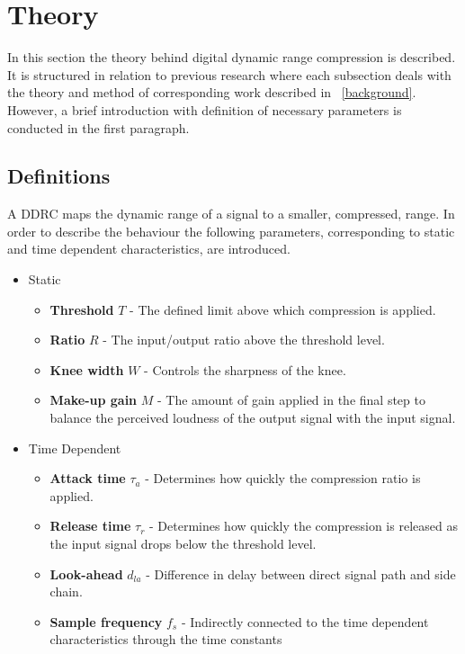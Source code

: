 \documentclass[../main2.tex]{subfiles}
\begin{document}
\section{Theory}\label{sec_theory}
In this section the theory behind digital dynamic range compression is described. It is structured in relation to previous research where each subsection deals with the theory and method of corresponding work described in ~\ref{background}. However, a brief introduction with definition of necessary parameters is conducted in the first paragraph. 

\subsection{Definitions} \label{theory_definitions}
A DDRC maps the dynamic range of a signal to a smaller, compressed, range. In order to describe the behaviour the following parameters, corresponding to static and time dependent characteristics, are introduced.
\begin{itemize}
\item{Static}
	\begin{itemize}
	\item \textbf{Threshold} $T$ - The defined limit above which compression is applied.
	\item \textbf{Ratio} $R$ - The input/output ratio above the threshold level.
	\item \textbf{Knee width}  $W$ - Controls the sharpness of the knee.
	\item \textbf{Make-up gain}  $M$ - The amount of gain applied in the final step to balance the perceived loudness of the output signal with the input signal.
\end{itemize}
\item{Time Dependent}
	\begin{itemize}
	\item \textbf{Attack time} $\tau_{a}$ - Determines how quickly the compression ratio is applied.
	\item \textbf{Release time} $\tau_{r}$ - Determines how quickly the compression is released as the input signal drops below the threshold level.
	\item \textbf{Look-ahead} $d_{la}$ - Difference in delay between direct signal path and side chain. 
	\item \textbf{Sample frequency} $f_{s}$ - Indirectly connected to the time dependent characteristics through the time constants
	\end{itemize}
\end{itemize}
\end{document}
